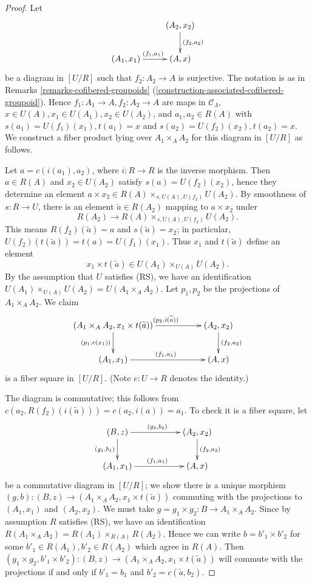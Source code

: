 \begin{proof}
Let 
\[
\xymatrix{
                           &     (A_2,x_2) \ar[d]^{(f_2,a_2)} \\
(A_1,x_1) \ar[r]^{(f_1,a_1)} &     (A,x)
}
\]
be a diagram in $[U/R]$ such that $f_2: A_2 \rightarrow A$ is surjective. The 
notation is as in Remarks \ref{remarks-cofibered-groupoids} 
(\ref{construction-associated-cofibered-groupoid}). Hence $f_1: A_1 \rightarrow 
A, f_2: A_2 \rightarrow A$ are maps in $\mathcal C_{\Lambda}$, $x \in U(A), x_1 
\in U(A_1), x_2 \in U(A_2)$, and $a_1,a_2 \in R(A)$ with $s(a_1) = U(f_1)(x_1), 
t(a_1) = x$ and $s(a_2) = U(f_2)(x_2), t(a_2) = x$. We construct a fiber 
product lying over $A_1 \times_{A} A_2$ for this diagram in $[U/R]$ as follows. 

\medskip \noindent 
Let $a = c(i(a_1),a_2)$, where $i: R \rightarrow R$ is the inverse morphism. 
Then $a \in R(A)$ and $x_2 \in U(A_2)$ satisfy $s(a) = U(f_2)(x_2)$, hence they 
determine an element $a \times x_2 \in R(A) \times_{s,U(A),U(f_2)} U(A_2)$. By 
smoothness of $s: R \rightarrow U$, there is an element $\widetilde{a} \in 
R(A_2)$ mapping to $a \times x_2$ under
\[ R(A_2) \rightarrow R(A) \times_{s,U(A),U(f_2)} U(A_2). \]
This means $R(f_2)(\widetilde{a}) = a$ and $s(\widetilde{a}) = x_2$; in 
particular, $U(f_2)(t(\widetilde{a})) = t(a) = U(f_1)(x_1)$. Thus $x_1$ and 
$t(\widetilde{a})$ define an element 
\[ x_1 \times t(\widetilde{a}) \in U(A_1) \times_{U(A)} U(A_2).\]
By the assumption that $U$ satisfies (RS), we have an identification $U(A_1) 
\times_{U(A)} U(A_2) = U(A_1 \times_{A} A_2)$.  Let $p_1,p_2$ be the 
projections of $A_1 \times_{A} A_2$.  We claim 
\[ 
\xymatrix{
(A_1 \times_{A} A_2, x_1 \times t(\widetilde{a})) \ar[d]_{(p_1, e(x_1))} 
\ar[rr]^{(p_2, i(\widetilde{a}))} & & (A_2, x_2) \ar[d]^{(f_2,a_2)} \\
(A_1, x_1) \ar[rr]^{(f_1,a_1)} && (A,x) 
}
\]
is a fiber square in $[U/R]$. (Note $e: U \rightarrow R$ denotes the identity.)

\medskip \noindent
The diagram is commutative; this follows from $c(a_2,R(f_2)(i(\widetilde{a}))) 
= c(a_2, i(a)) = a_1$. To check it is a fiber square, let
\[ 
\xymatrix{
(B, z) \ar[d]_{(g_1, b_1)} \ar[rr]^{(g_2, b_2)} & & (A_2, x_2) 
\ar[d]^{(f_2,a_2)} \\
(A_1, x_1) \ar[rr]^{(f_1,a_1)} && (A,x) 
}
\]
be a commutative diagram in $[U/R]$; we show there is a unique morphism $(g,b): 
(B, z) \rightarrow (A_1 \times_{A} A_2, x_1 \times t(\widetilde{a}))$ commuting 
with the projections to $(A_1,x_1)$ and $(A_2,x_2)$. We must take $g = g_1 
\times g_2: B \rightarrow A_1 \times_{A} A_2$.  Since by assumption $R$ 
satisfies (RS), we have an identification $R(A_1 \times_{A} A_2) = R(A_1) 
\times_{R(A)} R(A_2)$.  Hence we can write $b = b'_1 \times b'_2$ for some 
$b'_1 \in R(A_1), b'_2 \in R(A_2)$ which agree in $R(A)$. Then $(g_1 \times 
g_2, b'_1 \times b'_2): (B, z) \rightarrow (A_1 \times_{A} A_2, x_1 \times 
t(\widetilde{a}))$ will commute with the projections if and only if $b'_1 = 
b_1$ and $b'_2 = c(\widetilde{a}, b_2)$.
\end{proof}

